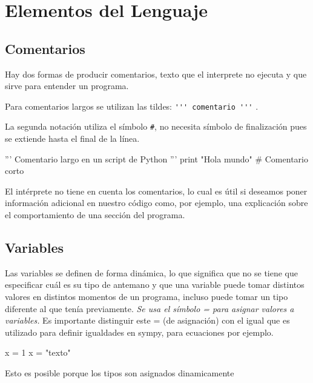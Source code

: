 \section{Elementos del Lenguaje}

\subsection{Comentarios}

Hay dos formas de producir comentarios, texto que el interprete  no ejecuta y que sirve para entender un programa.

Para comentarios largos se utilizan las tildes: \linebreak\verb~''' comentario '''~ .


 La segunda notación utiliza el símbolo \verb~#~, no necesita símbolo de finalización 
 pues se extiende hasta el final de la línea.

 \begin{pyverbatim}
'''
Comentario  largo en un script de Python
'''
print "Hola mundo" # Comentario corto
\end{pyverbatim}




El intérprete no tiene en cuenta los comentarios, lo cual es útil si deseamos poner información adicional en nuestro código como, por ejemplo, una explicación sobre el comportamiento de una sección del programa.








\subsection{Variables}
Las variables se definen de forma dinámica, lo que significa que no se tiene que especificar cuál es su tipo de antemano y que una variable puede tomar distintos valores en distintos momentos de un programa, incluso puede tomar
 un tipo diferente al que tenía previamente. \emph{Se usa el símbolo = para asignar valores a variables.}
\advertencia Es importante distinguir este = (de asignación) con el igual que es utilizado para definir igualdades en sympy, para ecuaciones por ejemplo.



\begin{pyverbatim}
x = 1
x = "texto" 
\end{pyverbatim}
Esto es posible porque los tipos son asignados
dinamicamente

